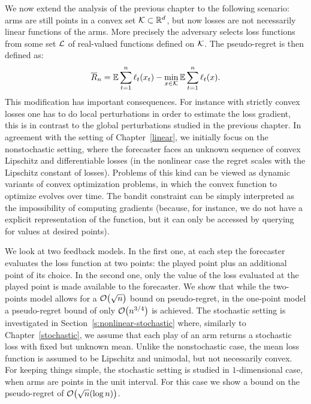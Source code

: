 We now extend the analysis of the previous chapter to the following scenario: arms are still points in a convex set $\mathcal{K} \subset \mathbb{R}^d$, but now losses are not necessarily linear functions of the arms. More precisely the adversary selects loss functions from some set $\mathcal{L}$ of real-valued functions defined on $\mathcal{K}$. The pseudo-regret is then defined as:
$$\overline{R}_n = \mathbb{E} \sum_{t=1}^n  \ell_t(x_t) - \min_{x \in \mathcal{K}} \mathbb{E} \sum_{t=1}^n \ell_t(x) .$$
This modification has important consequences.
For instance with strictly convex losses one has to do local perturbations in order to estimate the loss gradient, this is in contrast to the global perturbations studied in the previous chapter.
In agreement with the setting of Chapter~\ref{linear}, we initially focus on the nonstochastic setting, where the forecaster faces an unknown sequence of convex Lipschitz and differentiable losses (in the nonlinear case the regret scales with the Lipschitz constant of losses). Problems of this kind can be viewed as dynamic variants of convex optimization problems, in which the convex function to optimize evolves over time. The bandit constraint can be simply interpreted as the impossibility of computing gradients (because, for instance, we do not have a explicit representation of the function, but it can only be accessed by querying for values at desired points).

We look at two feedback models. In the first one, at each step the forecaster evaluates the loss function at two points: the played point plus an additional point of its choice. In the second one, only the value of the loss evaluated at the played point is made available to the forecaster. We show that while the two-points model allows for a $\mathcal{O}\bigl(\sqrt{n}\bigr)$ bound on pseudo-regret, in the one-point model a pseudo-regret bound of only $\mathcal{O}\bigl(n^{3/4}\bigr)$ is achieved. The stochastic setting is investigated in Section~\ref{s:nonlinear-stochastic} where, similarly to Chapter~\ref{stochastic}, we assume that each play of an arm returns a stochastic loss with fixed but unknown mean. Unlike the nonstochastic case, the mean loss function is assumed to be Lipschitz and unimodal, but not necessarily convex.
For keeping things simple, the stochastic setting is studied in $1$-dimensional case, when arms are points in the unit interval. For this case we show a bound on the pseudo-regret of $\mathcal{O}\bigl(\sqrt{n}(\log n)\bigr)$.

